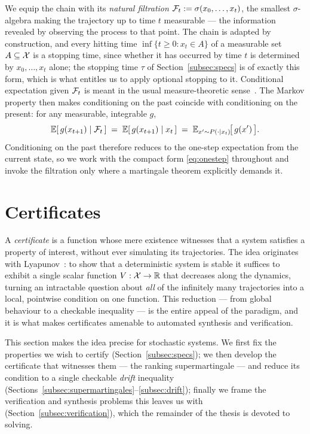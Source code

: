 We equip the chain with its \emph{natural filtration}
$\mathcal{F}_t := \sigma(x_0, \dots, x_t)$, the smallest $\sigma$-algebra making the
trajectory up to time $t$ measurable --- the information revealed by observing
the process to that point. The chain is adapted by construction, and every
hitting time $\inf\{t \geq 0 : x_t \in A\}$ of a measurable set
$A \subseteq \mathcal{X}$ is a stopping time, since whether it has occurred by time
$t$ is determined by $x_0, \dots, x_t$ alone; the stopping time $\tau$ of
Section~\ref{subsec:specs} is of exactly this form, which is what entitles us
to apply optional stopping to it. Conditional expectation given $\mathcal{F}_t$ is
meant in the usual measure-theoretic sense~\cite{williams1991probability}. The
Markov property then makes conditioning on the past coincide with conditioning
on the present: for any measurable, integrable $g$,
%
\begin{equation}
    \mathbb{E}[\, g(x_{t+1}) \mid \mathcal{F}_t \,]
    \;=\; \mathbb{E}[\, g(x_{t+1}) \mid x_t \,]
    \;=\; \mathbb{E}_{x' \sim P(\cdot \mid x_t)}\!\big[\,g(x')\,\big] .
    \label{eq:markov-property}
\end{equation}
%
Conditioning on the past therefore reduces to the one-step expectation from the
current state, so we work with the compact form \eqref{eq:onestep} throughout and
invoke the filtration only where a martingale theorem explicitly demands it.


\section{Certificates}
\label{sec:certificates}

A \textit{certificate} is a function whose mere existence witnesses that a system
satisfies a property of interest, without ever simulating its trajectories. The
idea originates with Lyapunov~\cite{lyapunov1992general}: to show that a
deterministic system is stable it suffices to exhibit a single scalar function
$V : \mathcal{X} \to \mathbb{R}$ that decreases along the dynamics, turning an intractable
question about \emph{all} of the infinitely many trajectories into a local,
pointwise condition on one function. This reduction --- from global behaviour to
a checkable inequality --- is the entire appeal of the paradigm, and it is what
makes certificates amenable to automated synthesis and verification.

This section makes the idea precise for stochastic systems. We first fix the
properties we wish to certify (Section~\ref{subsec:specs}); we then develop the
certificate that witnesses them --- the ranking supermartingale --- and reduce
its condition to a single checkable \emph{drift} inequality
(Sections~\ref{subsec:supermartingales}--\ref{subsec:drift}); finally we frame
the verification and synthesis problems this leaves us with
(Section~\ref{subsec:verification}), which the remainder of the thesis is devoted
to solving.

